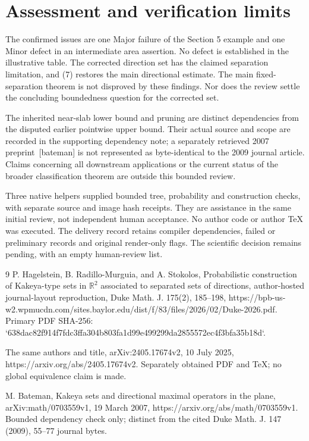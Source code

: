 \documentclass[10pt]{article}
\begin{document}
\section*{Assessment and verification limits}
The confirmed issues are one Major failure of the Section 5 example and one Minor defect in an intermediate area assertion. No defect is established in the illustrative table. The corrected direction set has the claimed separation limitation, and (7) restores the main directional estimate. The main fixed-separation theorem is not disproved by these findings. Nor does the review settle the concluding boundedness question for the corrected set.\par
The inherited near-slab lower bound and pruning are distinct dependencies from the disputed earlier pointwise upper bound. Their actual source and scope are recorded in the supporting dependency note; a separately retrieved 2007 preprint [bateman] is not represented as byte-identical to the 2009 journal article. Claims concerning all downstream applications or the current status of the broader classification theorem are outside this bounded review.\par
Three native helpers supplied bounded tree, probability and construction checks, with separate source and image hash receipts. They are assistance in the same initial review, not independent human acceptance. No author code or author TeX was executed. The delivery record retains compiler dependencies, failed or preliminary records and original render-only flags. The scientific decision remains pending, with an empty human-review list.\par
9 P. Hagelstein, B. Radillo-Murguia, and A. Stokolos, Probabilistic construction of Kakeya-type sets in \(\mathbb R^2\) associated to separated sets of directions, author-hosted journal-layout reproduction, Duke Math. J. 175(2), 185–198, https://bpb-us-w2.wpmucdn.com/sites.baylor.edu/dist/f/83/files/2026/02/Duke-2026.pdf. Primary PDF SHA-256: `638dac82f914f7fdc3ffa304b803fa1d99e499299da2855572ec4f3bfa35b18d`.\par
The same authors and title, arXiv:2405.17674v2, 10 July 2025, https://arxiv.org/abs/2405.17674v2. Separately obtained PDF and TeX; no global equivalence claim is made.\par
M. Bateman, Kakeya sets and directional maximal operators in the plane, arXiv:math/0703559v1, 19 March 2007, https://arxiv.org/abs/math/0703559v1. Bounded dependency check only; distinct from the cited Duke Math. J. 147 (2009), 55–77 journal bytes.\par
\end{document}
